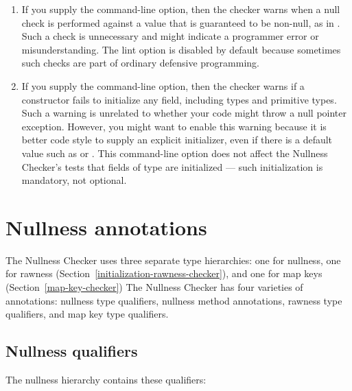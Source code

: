 \label{lint-nulltest-section}\label{lint-uninitialized-section}
\begin{enumerate}
\item
  \label{lint-nulltest-item}%
  If you supply the  command-line option, then the
  checker warns when a null check is performed against a value that is
  guaranteed to be non-null, as in .  Such a check is
  unnecessary and might indicate a programmer error or misunderstanding.
  The lint option is disabled by default because sometimes such checks are
  part of ordinary defensive programming.  

\item
  \label{lint-uninitialized-item}%
  If you supply the  command-line option, then
  the checker warns if a constructor fails to initialize any field,
  including  types and primitive
  types.  Such a warning is unrelated to whether your code might throw a
  null pointer exception.  However, you might want to enable this warning
  because it is better code style to supply an explicit initializer, even
  if there is a default value such as  or .
  This command-line option does not affect the Nullness Checker's tests
  that fields of  type are
  initialized --- such initialization is mandatory, not optional.

\end{enumerate}


\section{Nullness annotations\label{nullness-annotations}}

The Nullness Checker uses three separate type hierarchies:  one for nullness,
one for rawness (Section~\ref{initialization-rawness-checker}),
and one for map keys (Section~\ref{map-key-checker})
The Nullness Checker has four varieties of annotations:  nullness
type qualifiers, nullness method annotations, rawness type qualifiers, and
map key type
qualifiers.

\subsection{Nullness qualifiers\label{nullness-qualifiers}}

The nullness hierarchy contains these qualifiers:

